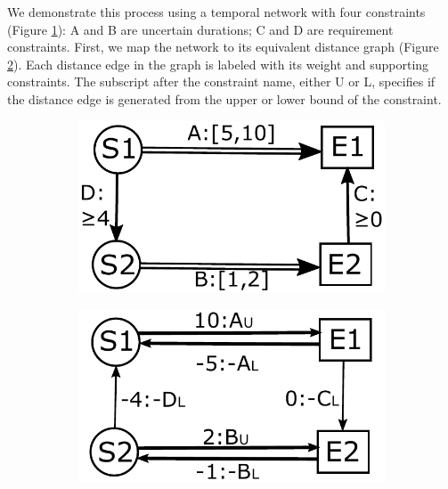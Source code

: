\documentclass[jair,twoside,11pt,theapa]{article}
\begin{document}
We demonstrate this process using a temporal network with four constraints
(Figure \ref{fig:sc_reduction_1}): A and B are uncertain durations; C and D are requirement constraints. First, we map the
network to its equivalent distance graph (Figure \ref{fig:sc_reduction_2}). Each
distance edge in the graph is labeled with its weight and supporting
constraints. The subscript after the constraint name, either U or L, specifies
if the distance edge is generated from the upper or lower bound of the
constraint.

\begin{figure}[ht!]
	\centering
	\begin{subfigure}[b]{0.235\textwidth}
		\includegraphics[width=\textwidth]{figures/sc_reduction_1.pdf}
		\caption{}
		\label{fig:sc_reduction_1}
	\end{subfigure}
	\begin{subfigure}[b]{0.235\textwidth}
		\includegraphics[width=\textwidth]{figures/sc_reduction_2.pdf}
		\caption{}
		\label{fig:sc_reduction_2}
	\end{subfigure}
	\begin{subfigure}[b]{0.22\textwidth}

\end{subfigure}
\end{figure}
\end{document}
